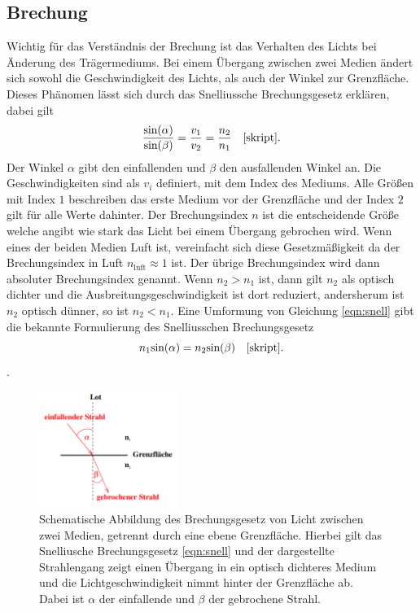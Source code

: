 \subsection{Brechung}
Wichtig für das Verständnis der Brechung ist das Verhalten des Lichts bei Änderung des Trägermediums. Bei einem Übergang zwischen zwei Medien ändert sich sowohl die Geschwindigkeit des Lichts, als auch der Winkel zur Grenzfläche.
Dieses Phänomen lässt sich durch das Snelliussche Brechungsgesetz erklären, dabei gilt 
\begin{equation}
    \label{eqn:snell}
    \frac{\text{sin}(\alpha)}{\text{sin} (\beta)} = \frac{v_1}{v_2} = \frac{n_2}{n_1} \quad \text{\cite{skript}}.
\end{equation}
Der Winkel $\alpha$ gibt den einfallenden und $\beta$ den ausfallenden Winkel an. Die Geschwindigkeiten sind als $v_{i}$ definiert, mit dem Index des Mediums. Alle Größen mit Index $1$ beschreiben das erste Medium vor der Grenzfläche und der Index $2$ gilt für alle Werte dahinter. Der Brechungsindex $n$ ist die
entscheidende Größe welche angibt wie stark das Licht bei einem Übergang gebrochen wird. Wenn eines der beiden Medien Luft ist, vereinfacht sich diese Gesetzmäßigkeit da der Brechungsindex in Luft $n_{\text{luft}} \approx 1$ ist. Der übrige
Brechungsindex wird dann absoluter Brechungsindex genannt.
Wenn $n_2 > n_1$ ist, dann gilt $n_2$ als optisch dichter und die Ausbreitungsgeschwindigkeit ist dort reduziert, andersherum ist $n_2$ optisch dünner, so ist $n_2 < n_1$.
Eine Umformung von Gleichung \eqref{eqn:snell} gibt die bekannte Formulierung des Snelliusschen Brechungsgesetz 
\begin{equation*}
n_1 \text{sin}(\alpha) = n_2 \text{sin}(\beta) \quad \text{\cite{skript}}.
\end{equation*}
\cite{skript}.
\begin{figure}
    \centering
    \includegraphics[width=0.4\textwidth]{bilder/2.png}
    \caption{Schematische Abbildung des Brechungsgesetz von Licht zwischen zwei Medien, getrennt durch eine ebene Grenzfläche. Hierbei gilt das Snelliusche Brechungsgesetz \eqref{eqn:snell} und der dargestellte Strahlengang zeigt einen Übergang in ein optisch
    dichteres Medium und die Lichtgeschwindigkeit nimmt hinter der Grenzfläche ab. Dabei ist $\alpha$ der einfallende und $\beta$ der gebrochene Strahl. \cite{skript}}
    \label{fig:brechung}
\end{figure}

